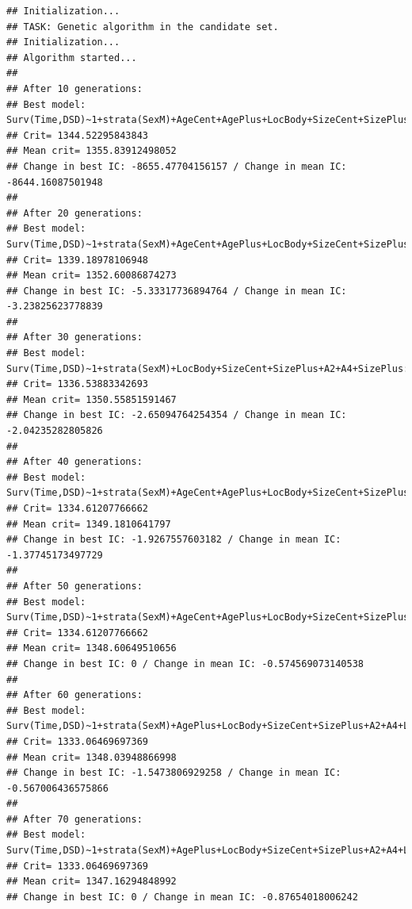 \documentclass{article}\usepackage[]{graphicx}\usepackage[]{color}
\makeatletter
\newenvironment{kframe}{%
 \def\at@end@of@kframe{}%
 \ifinner\ifhmode%
  \def\at@end@of@kframe{\end{minipage}}%
  \begin{minipage}{\columnwidth}%
 \fi\fi%
 \def\FrameCommand##1{\hskip\@totalleftmargin \hskip-\fboxsep
 \colorbox{shadecolor}{##1}\hskip-\fboxsep
     \hskip-\linewidth \hskip-\@totalleftmargin \hskip\columnwidth}%
 \MakeFramed {\advance\hsize-\width
   \@totalleftmargin\z@ \linewidth\hsize
   \@setminipage}}%
 {\par\unskip\endMakeFramed%
 \at@end@of@kframe}
\newenvironment{knitrout}{}{} %
\makeatother
\begin{document}
\begin{knitrout}
\begin{kframe}
\begin{alltt}
\end{alltt}
\begin{verbatim}
## Initialization...
## TASK: Genetic algorithm in the candidate set.
## Initialization...
## Algorithm started...
## 
## After 10 generations:
## Best model: Surv(Time,DSD)~1+strata(SexM)+AgeCent+AgePlus+LocBody+SizeCent+SizePlus+A2+A4+LocBody:AgePlus+SizeCent:LocBody+SizePlus:AgeCent+A2:SizeCent+A2:SizePlus+A4:LocBody+A4:SizeCent+strata(SexM):AgePlus+strata(SexM):LocBody+strata(SexM):SizePlus
## Crit= 1344.52295843843
## Mean crit= 1355.83912498052
## Change in best IC: -8655.47704156157 / Change in mean IC: -8644.16087501948
## 
## After 20 generations:
## Best model: Surv(Time,DSD)~1+strata(SexM)+AgeCent+AgePlus+LocBody+SizeCent+SizePlus+A2+A4+LocBody:AgePlus+SizeCent:LocBody+A2:AgeCent+A2:SizeCent+A4:AgeCent+strata(SexM):AgePlus+strata(SexM):SizePlus
## Crit= 1339.18978106948
## Mean crit= 1352.60086874273
## Change in best IC: -5.33317736894764 / Change in mean IC: -3.23825623778839
## 
## After 30 generations:
## Best model: Surv(Time,DSD)~1+strata(SexM)+LocBody+SizeCent+SizePlus+A2+A4+SizePlus:LocBody+A2:SizeCent+A2:SizePlus+A4:A2+strata(SexM):SizePlus
## Crit= 1336.53883342693
## Mean crit= 1350.55851591467
## Change in best IC: -2.65094764254354 / Change in mean IC: -2.04235282805826
## 
## After 40 generations:
## Best model: Surv(Time,DSD)~1+strata(SexM)+AgeCent+AgePlus+LocBody+SizeCent+SizePlus+A2+A4+LocBody:AgePlus+SizeCent:LocBody+A2:SizeCent+strata(SexM):AgePlus+strata(SexM):SizePlus
## Crit= 1334.61207766662
## Mean crit= 1349.1810641797
## Change in best IC: -1.9267557603182 / Change in mean IC: -1.37745173497729
## 
## After 50 generations:
## Best model: Surv(Time,DSD)~1+strata(SexM)+AgeCent+AgePlus+LocBody+SizeCent+SizePlus+A2+A4+LocBody:AgePlus+SizeCent:LocBody+A2:SizeCent+strata(SexM):AgePlus+strata(SexM):SizePlus
## Crit= 1334.61207766662
## Mean crit= 1348.60649510656
## Change in best IC: 0 / Change in mean IC: -0.574569073140538
## 
## After 60 generations:
## Best model: Surv(Time,DSD)~1+strata(SexM)+AgePlus+LocBody+SizeCent+SizePlus+A2+A4+LocBody:AgePlus+SizeCent:LocBody+A2:SizeCent+strata(SexM):AgePlus+strata(SexM):SizePlus
## Crit= 1333.06469697369
## Mean crit= 1348.03948866998
## Change in best IC: -1.5473806929258 / Change in mean IC: -0.567006436575866
## 
## After 70 generations:
## Best model: Surv(Time,DSD)~1+strata(SexM)+AgePlus+LocBody+SizeCent+SizePlus+A2+A4+LocBody:AgePlus+SizeCent:LocBody+A2:SizeCent+strata(SexM):AgePlus+strata(SexM):SizePlus
## Crit= 1333.06469697369
## Mean crit= 1347.16294848992
## Change in best IC: 0 / Change in mean IC: -0.87654018006242

\end{verbatim}
\end{kframe}
\end{knitrout}
\end{document}
